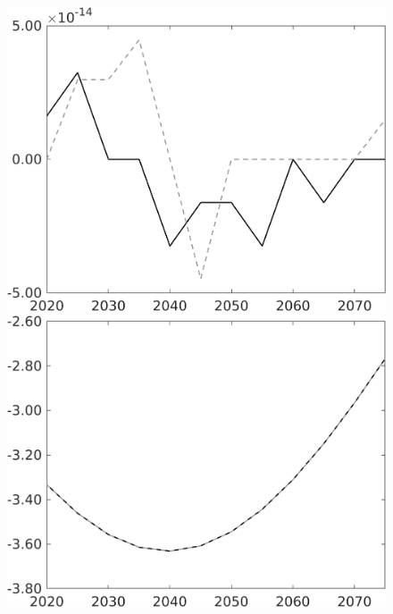 \documentclass[12pt]{article}
\begin{document}
\begin{figure}[h!!]
\begin{minipage}[]{0.32\textwidth}
\end{minipage}	
		\begin{minipage}[]{0.32\textwidth}
		\includegraphics[width=1\textwidth]{../../codding_model/own_basedOnFried/optimalPol_010922_revision/figures/all_13Sept22/PerdifNoTauf_Equlab_regime0_CompTaul_hh_spillover0_nsk1_xgr1_knspil1_sep1_LFlimit0_emsbase0_countec0_GovRev0_etaa0.79_lgd0.png}
	\end{minipage}	
		\begin{minipage}[]{0.32\textwidth}
		\includegraphics[width=1\textwidth]{../../codding_model/own_basedOnFried/optimalPol_010922_revision/figures/all_13Sept22/PerdifNoTauf_Equlab_regime0_CompTaul_C_spillover0_nsk1_xgr1_knspil1_sep1_LFlimit0_emsbase0_countec0_GovRev0_etaa0.79_lgd0.png}

\end{minipage}
\end{figure}
\end{document}
